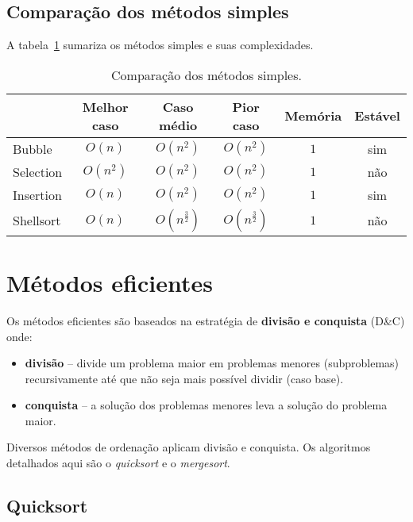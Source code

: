 \subsection{Comparação dos métodos simples}

A tabela~\ref{aula03:tab:caso01} sumariza os métodos simples e suas complexidades.
%
\begin{table}[!ht]
\centering
\caption{Comparação dos métodos simples.}
\begin{tabular}{lccccc}
\hline
          & Melhor caso & Caso médio & Pior caso & Memória & Estável \\ \hline
Bubble    & $O(n)$ & $O(n^2)$ & $O(n^2)$ & $1$ & sim \\ \hline
Selection & $O(n^2)$ & $O(n^2)$ & $O(n^2)$ & $1$ & não  \\ \hline
Insertion & $O(n)$ & $O(n^2)$ & $O(n^2)$ & $1$ &  sim \\ \hline
Shellsort & $O(n)$ & $O(n^{\frac{3}{2}})$ & $O(n^{\frac{3}{2}})$ &  $1$ & não \\ \hline
\end{tabular}
\label{aula03:tab:caso01}
\end{table}

\section{Métodos eficientes}

Os métodos eficientes são baseados na estratégia de {\bf divisão e conquista} (D\&C)
onde:
\begin{itemize}
\item {\bf divisão} -- divide um problema maior em problemas menores (subproblemas) 
recursivamente até que não seja mais possível dividir (caso base).

\item {\bf conquista} -- a solução dos problemas menores leva a solução do problema maior.
\end{itemize}

Diversos métodos de ordenação aplicam divisão e conquista. Os algoritmos detalhados
aqui são o \emph{quicksort} e o \emph{mergesort}.

\subsection{Quicksort}

